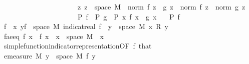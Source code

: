 \begin{isabellebody}
\ \ \ \ \ \ \ \ \ \ \ \ \ \ \ \ \ \ \ \ \ \ {\isacharparenleft}{\kern0pt}{\isasymAnd}z{\isachardot}{\kern0pt}\ z\ {\isasymin}\ space\ M\ {\isasymLongrightarrow}\ norm\ {\isacharparenleft}{\kern0pt}f\ z\ {\isacharplus}{\kern0pt}\ g\ z{\isacharparenright}{\kern0pt}\ {\isacharequal}{\kern0pt}\ norm\ {\isacharparenleft}{\kern0pt}f\ z{\isacharparenright}{\kern0pt}\ {\isacharplus}{\kern0pt}\ norm\ {\isacharparenleft}{\kern0pt}g\ z{\isacharparenright}{\kern0pt}{\isacharparenright}{\kern0pt}\ {\isasymLongrightarrow}\isanewline
\ \ \ \ \ \ \ \ \ \ \ \ \ \ \ \ \ \ \ \ \ \ P\ f\ {\isasymLongrightarrow}\ P\ g\ {\isasymLongrightarrow}\ P\ {\isacharparenleft}{\kern0pt}{\isasymlambda}x{\isachardot}{\kern0pt}\ f\ x\ {\isacharplus}{\kern0pt}\ g\ x{\isacharparenright}{\kern0pt}{\isachardoublequoteclose}\isanewline
\ \ \ {\isachardoublequoteopen}P\ f{\isachardoublequoteclose}%
\endisatagimportant
{\isafoldimportant}%
%
\isadelimimportant
\isanewline
%
\endisadelimimportant
%
\isadelimproof
%
\endisadelimproof
%
\isatagproof
{}\isamarkupfalse%
{\isacharminus}{\kern0pt}\isanewline
\ \ \isamarkupfalse%
\ {\isacharquery}{\kern0pt}f\ {\isacharequal}{\kern0pt}\ {\isachardoublequoteopen}{\isasymlambda}x{\isachardot}{\kern0pt}\ {\isacharparenleft}{\kern0pt}{\isasymSum}y{\isasymin}f\ {\isacharbackquote}{\kern0pt}\ space\ M{\isachardot}{\kern0pt}\ indicat{\isacharunderscore}{\kern0pt}real\ {\isacharparenleft}{\kern0pt}f\ {\isacharminus}{\kern0pt}{\isacharbackquote}{\kern0pt}\ {\isacharbraceleft}{\kern0pt}y{\isacharbraceright}{\kern0pt}\ {\isasyminter}\ space\ M{\isacharparenright}{\kern0pt}\ x\ {\isacharasterisk}{\kern0pt}\isactrlsub R\ y{\isacharparenright}{\kern0pt}{\isachardoublequoteclose}\isanewline
\ \ \isamarkupfalse%
\ f{\isacharunderscore}{\kern0pt}ae{\isacharunderscore}{\kern0pt}eq{\isacharcolon}{\kern0pt}\ {\isachardoublequoteopen}f\ x\ {\isacharequal}{\kern0pt}\ {\isacharquery}{\kern0pt}f\ x{\isachardoublequoteclose}\ \ {\isachardoublequoteopen}x\ {\isasymin}\ space\ M{\isachardoublequoteclose}\ \ x\ \isamarkupfalse%
\ simple{\isacharunderscore}{\kern0pt}function{\isacharunderscore}{\kern0pt}indicator{\isacharunderscore}{\kern0pt}representation{\isacharbrackleft}{\kern0pt}OF\ f{\isacharparenleft}{\kern0pt}{}{\isacharparenright}{\kern0pt}\ that{\isacharbrackright}{\kern0pt}\ \isacommand{{\isachardot}{\kern0pt}}\isamarkupfalse%
\isanewline
\ \ \isamarkupfalse%
\ \isamarkupfalse%
\ {\isachardoublequoteopen}emeasure\ M\ {\isacharbraceleft}{\kern0pt}y\ {\isasymin}\ space\ M{\isachardot}{\kern0pt}\ {\isacharquery}{\kern0pt}f\ y\ {\isasymnoteq}\ {}{\isacharbraceright}{\kern0pt}\ {\isasymnoteq}\ {\isasyminfinity}{\isachardoublequoteclose}\ \isamarkupfalse%

\end{isabellebody}
